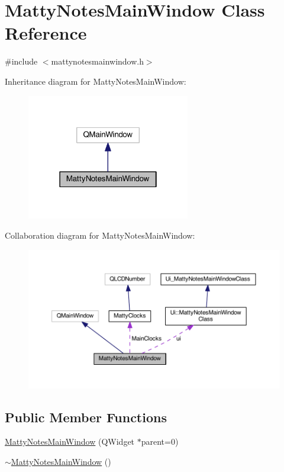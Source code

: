 \hypertarget{classMattyNotesMainWindow}{}\section{Matty\+Notes\+Main\+Window Class Reference}
\label{classMattyNotesMainWindow}


{\ttfamily \#include $<$mattynotesmainwindow.\+h$>$}



Inheritance diagram for Matty\+Notes\+Main\+Window\+:
\nopagebreak
\begin{figure}[H]
\begin{center}
\leavevmode
\includegraphics[width=202pt]{classMattyNotesMainWindow__inherit__graph}
\end{center}
\end{figure}


Collaboration diagram for Matty\+Notes\+Main\+Window\+:
\nopagebreak
\begin{figure}[H]
\begin{center}
\leavevmode
\includegraphics[width=350pt]{classMattyNotesMainWindow__coll__graph}
\end{center}
\end{figure}
\subsection*{Public Member Functions}
\begin{DoxyCompactItemize}
\item 
\hyperlink{classMattyNotesMainWindow_aa788ae37a712be6e1ea281c349342908}{Matty\+Notes\+Main\+Window} (Q\+Widget $\ast$parent=0)
\item 
\hyperlink{classMattyNotesMainWindow_a691c1dfd2497d55387fe8ee6177c92d7}{$\sim$\+Matty\+Notes\+Main\+Window} ()
\end{DoxyCompactItemize}
